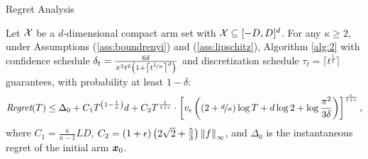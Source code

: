 \begin{frame}{Regret Analysis}
\begin{theorem}[2]
	Let $\Xspace$ be a $d$-dimensional compact arm set with $\Xspace \subseteq [-D,D]^d$. For any $\kappa\geq2$, under Assumptions (\ref{ass:boundrenyi}) and (\ref{ass:lipschitz}), Algorithm \ref{alg:2} with confidence schedule ${\delta_t = \frac{6\delta}{\pi^2t^2\left(1+\left\lceil t^{\nicefrac{1}{\kappa}}\right\rceil^d\right)}}$ and discretization schedule $\tau_t=\lceil t^{\frac{1}{\kappa}} \rceil$ guarantees, with probability at least $1-\delta$:
	\begin{equation*}
	\Reg(T) \leq \Delta_0  + C_1T^{\left(1-\frac{1}{\kappa}\right)}d
	+ C_2
	T^{\frac{1}{1+\epsilon}}\cdot\left[v_{\epsilon}
	\left(\left(2+ \nicefrac{d}{\kappa}\right)\log T + d\log 2 + \log\frac{\pi^2}{3\delta}\right)\right]^{\frac{\epsilon}{1+\epsilon}},
	\end{equation*}
	where $C_1=\frac{\kappa}{\kappa-1}LD$, $C_2=(1+\epsilon)\left(2\sqrt{2}+\frac{5}{3}\right)\norm[\infty]{f}$, and $\Delta_0$ is the instantaneous regret of the initial arm $\vx_0$.
\end{theorem}
\end{frame}
